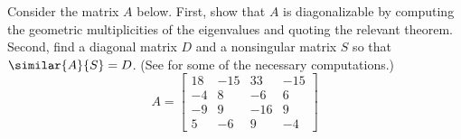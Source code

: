 Consider the matrix $A$ below.  First, show that $A$ is diagonalizable by computing the geometric multiplicities of the eigenvalues and quoting the relevant theorem.  Second, find a diagonal matrix $D$ and a nonsingular matrix $S$ so that $\similar{A}{S}=D$.  (See  for some of the necessary computations.)
%
\begin{equation*}
A=
\begin{bmatrix}
18 & -15 & 33 & -15\\
-4 & 8 & -6 & 6\\
-9 & 9 & -16 & 9\\
5 & -6 & 9 & -4
\end{bmatrix}
\end{equation*}
